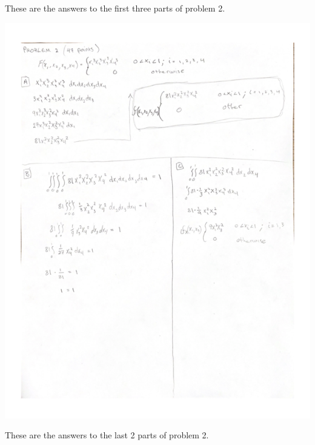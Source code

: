 \documentclass[
]{article}
\begin{document}
These are the answers to the first three parts of problem 2.

\includegraphics{./Q2sideA.png}

These are the answers to the last 2 parts of problem 2.
\end{document}
